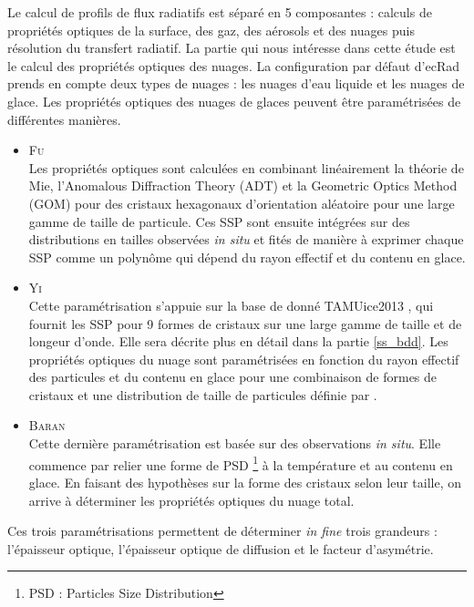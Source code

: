 Le calcul de profils de flux radiatifs est séparé en 5 composantes : calculs de propriétés optiques de la surface, des gaz, des aérosols et des nuages puis résolution du transfert radiatif. La partie qui nous intéresse dans cette étude est le calcul des propriétés optiques des nuages. La configuration par défaut d'ecRad prends en compte deux types de nuages : les nuages d'eau liquide et les nuages de glace. Les propriétés optiques des nuages de glaces peuvent être paramétrisées de différentes manières. 
\begin{itemize}
    \item \textsc{Fu} \citep{fu_accurate_1996,fu_accurate_1998} \\
    Les propriétés optiques sont calculées en combinant linéairement la théorie de Mie, l'Anomalous Diffraction Theory (ADT) et la Geometric Optics Method (GOM) pour des cristaux hexagonaux d'orientation aléatoire pour une large gamme de taille de particule. Ces SSP sont ensuite intégrées sur des distributions en tailles observées \emph{in situ} et fités de manière à exprimer chaque SSP comme un polynôme qui dépend du rayon effectif et du contenu en glace. 
    \item \textsc{Yi} \citep{yi_influence_2013} \\
    Cette paramétrisation s'appuie sur la base de donné TAMUice2013 \citep{yang_spectrally_2013}, qui fournit les SSP pour 9 formes de cristaux sur une large gamme de taille et de longeur d'onde. Elle sera décrite plus en détail dans la partie \ref{ss_bdd}. Les propriétés optiques du nuage sont paramétrisées en fonction du rayon effectif des particules et du contenu en glace pour une combinaison de formes de cristaux et une distribution de taille de particules définie par \cite{baum_improvements_2011}. 
    \item \textsc{Baran} \citep{baran_coupled_2014, baran_impact_2016} \\
    Cette dernière paramétrisation est basée sur des observations \emph{in situ}. Elle commence par relier une forme de PSD \footnote{PSD : Particles Size Distribution} à la température et au contenu en glace. En faisant des hypothèses sur la forme des cristaux selon leur taille, on arrive à déterminer les propriétés optiques du nuage total. 
\end{itemize}

Ces trois paramétrisations permettent de déterminer \emph{in fine} trois grandeurs : l'épaisseur optique, l'épaisseur optique de diffusion et le facteur d'asymétrie.



